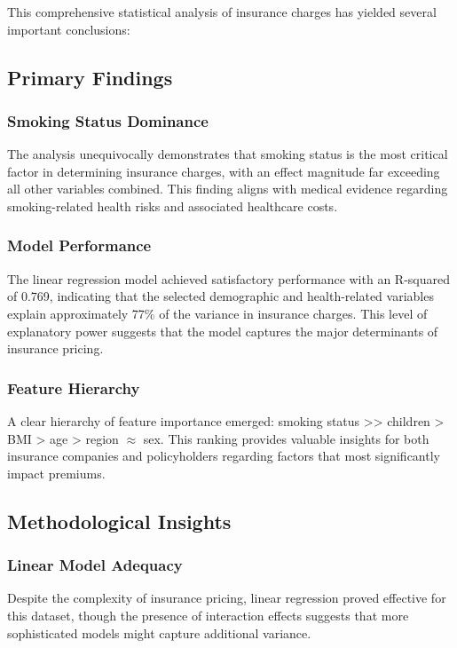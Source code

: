 \documentclass[12pt,a4paper]{article}
\begin{document}
This comprehensive statistical analysis of insurance charges has yielded several important conclusions:

\subsection{Primary Findings}

\subsubsection{Smoking Status Dominance}
The analysis unequivocally demonstrates that smoking status is the most critical factor in determining insurance charges, with an effect magnitude far exceeding all other variables combined. This finding aligns with medical evidence regarding smoking-related health risks and associated healthcare costs.

\subsubsection{Model Performance}
The linear regression model achieved satisfactory performance with an R-squared of 0.769, indicating that the selected demographic and health-related variables explain approximately 77\% of the variance in insurance charges. This level of explanatory power suggests that the model captures the major determinants of insurance pricing.

\subsubsection{Feature Hierarchy}
A clear hierarchy of feature importance emerged: smoking status >> children > BMI > age > region $\approx$ sex. This ranking provides valuable insights for both insurance companies and policyholders regarding factors that most significantly impact premiums.

\subsection{Methodological Insights}

\subsubsection{Linear Model Adequacy}
    Despite the complexity of insurance pricing, linear regression proved effective for this dataset, though the presence of interaction effects suggests that more sophisticated models might capture additional variance.
\end{document}
